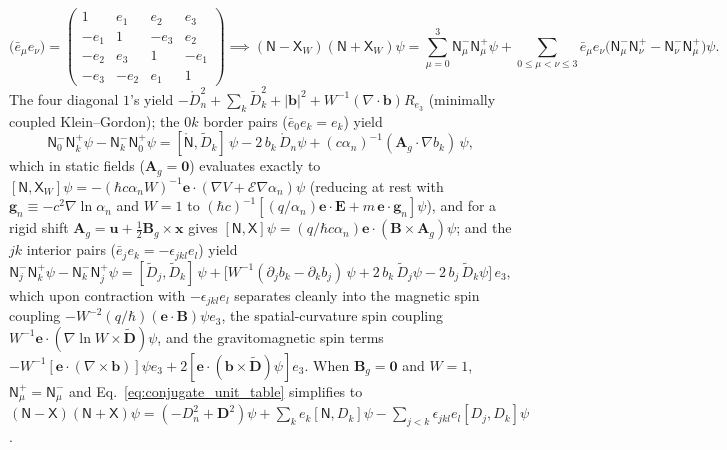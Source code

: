 \documentclass[aps,prd,onecolumn,tightenlines,nofootinbib,notitlepage,10pt,floatfix]{revtex4-2}
\theoremstyle{indentedtheorem}
\begin{document}
\begin{equation}
    \big(\bar{e}_\mu e_\nu\big) = \begin{pmatrix} 1 & e_1 & e_2 & e_3 \\ -e_1 & 1 & -e_3 & e_2 \\ -e_2 & e_3 & 1 & -e_1 \\ -e_3 & -e_2 & e_1 & 1 \end{pmatrix} \implies (\mathsf{N}-\mathsf{X}_W)(\mathsf{N}+\mathsf{X}_W)\psi = \sum_{\mu=0}^3 \mathsf{N}_\mu^-\mathsf{N}_\mu^+\psi + \sum_{0\le\mu<\nu\le 3}\bar{e}_\mu e_\nu\big(\mathsf{N}_\mu^-\mathsf{N}_\nu^+-\mathsf{N}_\nu^-\mathsf{N}_\mu^+\big)\psi .
    \label{eq:conjugate_unit_table}
\end{equation}
The four diagonal $1$'s yield $-\mathring{D}_n^2+\sum_k\tilde{D}_k^2+|\mathbf{b}|^2+W^{-1}(\nabla\cdot\mathbf{b})R_{e_3}$ (minimally coupled Klein--Gordon); the $0k$ border pairs ($\bar{e}_0 e_k=e_k$) yield
\begin{equation}
    \mathsf{N}_0^-\mathsf{N}_k^+\psi - \mathsf{N}_k^-\mathsf{N}_0^+\psi = [\mathring{\mathsf{N}},\tilde{D}_k]\,\psi - 2\,b_k\,\mathring{D}_n\psi + (c\alpha_n)^{-1}(\mathbf{A}_g\cdot\nabla b_k)\,\psi ,
    \label{eq:border_entry}
\end{equation}
which in static fields ($\mathbf{A}_g=\mathbf{0}$) evaluates exactly to $[\mathsf{N},\mathsf{X}_W]\psi=-(\hbar c\alpha_n W)^{-1}\mathbf{e}\cdot(\nabla V+\mathcal{E}\nabla\alpha_n)\psi$ (reducing at rest with $\mathbf{g}_n\equiv -c^2\nabla\ln\alpha_n$ and $W=1$ to $(\hbar c)^{-1}[(q/\alpha_n)\mathbf{e}\cdot\mathbf{E}+m\,\mathbf{e}\cdot\mathbf{g}_n]\psi$), and for a rigid shift $\mathbf{A}_g=\mathbf{u}+\tfrac{1}{2}\mathbf{B}_g\times\mathbf{x}$ gives $[\mathsf{N},\mathsf{X}]\psi=(q/\hbar c\alpha_n)\mathbf{e}\cdot(\mathbf{B}\times\mathbf{A}_g)\psi$; and the $jk$ interior pairs ($\bar{e}_j e_k=-\epsilon_{jkl}e_l$) yield
\begin{equation}
    \mathsf{N}_j^-\mathsf{N}_k^+\psi - \mathsf{N}_k^-\mathsf{N}_j^+\psi = [\tilde{D}_j,\tilde{D}_k]\,\psi + \big[W^{-1}(\partial_j b_k-\partial_k b_j)\,\psi + 2\,b_k\,\tilde{D}_j\psi - 2\,b_j\,\tilde{D}_k\psi\big]\,e_3 ,
    \label{eq:interior_entry}
\end{equation}
which upon contraction with $-\epsilon_{jkl}e_l$ separates cleanly into the magnetic spin coupling $-W^{-2}(q/\hbar)(\mathbf{e}\cdot\mathbf{B})\psi e_3$, the spatial-curvature spin coupling $W^{-1}\mathbf{e}\cdot(\nabla\ln W\times\tilde{\mathbf{D}})\psi$, and the gravitomagnetic spin terms $-W^{-1}[\mathbf{e}\cdot(\nabla\times\mathbf{b})]\psi e_3+2[\mathbf{e}\cdot(\mathbf{b}\times\tilde{\mathbf{D}})\psi]e_3$. When $\mathbf{B}_g=\mathbf{0}$ and $W=1$, $\mathsf{N}_\mu^+=\mathsf{N}_\mu^-$ and Eq.~\eqref{eq:conjugate_unit_table} simplifies to $(\mathsf{N}-\mathsf{X})(\mathsf{N}+\mathsf{X})\psi=(-D_n^2+\mathbf{D}^2)\psi+\sum_k e_k[\mathsf{N},D_k]\psi-\sum_{j<k}\epsilon_{jkl}e_l[D_j,D_k]\psi$.
\end{document}
